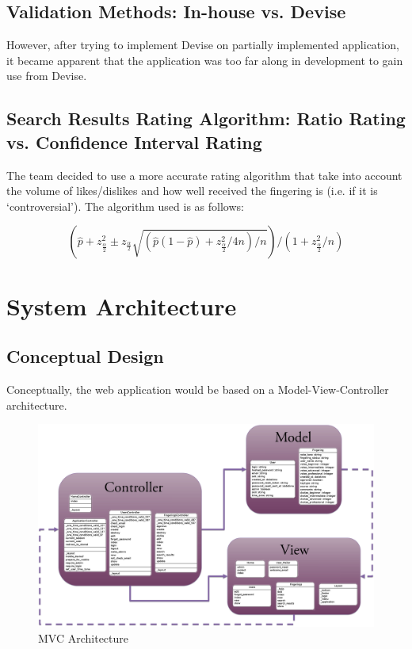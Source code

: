 \documentclass[12pt,english]{article}
\begin{document}
\subsection{Validation Methods: In-house vs. Devise}
However, after trying to implement Devise on partially implemented
application, it became apparent that the application was too far along
in development to gain use from Devise.

\subsection{Search Results Rating Algorithm: Ratio Rating vs. Confidence Interval Rating}
The team decided to use a more accurate rating algorithm that take
into account the volume of likes/dislikes and how well received the
fingering is (i.e. if it is `controversial'). The algorithm used is
as follows:

\[
(\hat{p}+z_{\frac{\alpha}{2}}^{2}\pm z_{\frac{\alpha}{2}}\sqrt{(\hat{p}(1-\hat{p})+z_{\frac{\alpha}{2}}^{2}/4n)/n})/(1+z_{\frac{\alpha}{2}}^{2}/n)
\]

\section{System Architecture}
\subsection{Conceptual Design}
Conceptually, the web application would be based on a Model-View-Controller
architecture.

\begin{figure}[H]
	\caption{MVC Architecture}
	\includegraphics[scale=0.15]{MVC} 
\end{figure}
\end{document}
